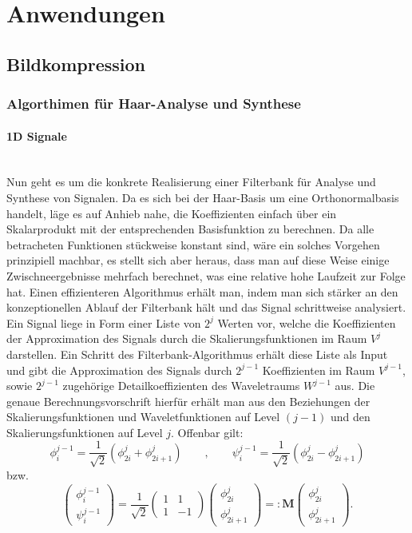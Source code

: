 \section{Anwendungen}
%
\subsection{Bildkompression}
%
\subsubsection{Algorthimen für Haar-Analyse und Synthese}
%
\paragraph{1D Signale}~\\
Nun geht es um die konkrete Realisierung einer Filterbank für Analyse und Synthese von Signalen. Da es sich bei der Haar-Basis um eine Orthonormalbasis handelt, läge es auf Anhieb nahe, die Koeffizienten einfach über ein Skalarprodukt mit der entsprechenden Basisfunktion zu berechnen. Da alle betracheten Funktionen stückweise konstant sind, wäre ein solches Vorgehen prinzipiell machbar, es stellt sich aber heraus, dass man auf diese Weise einige Zwischneergebnisse mehrfach berechnet, was eine relative hohe Laufzeit zur Folge hat. Einen effizienteren Algorithmus erhält man, indem man sich stärker an den konzeptionellen Ablauf der Filterbank hält und das Signal schrittweise analysiert.
%
Ein Signal liege in Form einer Liste von $2^j$ Werten vor, welche die Koeffizienten der Approximation des Signals durch die Skalierungsfunktionen im Raum $V^j$ darstellen. Ein Schritt des Filterbank-Algorithmus erhält diese Liste als Input und gibt die Approximation des Signals durch $2^{j-1}$ Koeffizienten im Raum $V^{j-1}$, sowie $2^{j-1}$ zugehörige Detailkoeffizienten des Waveletraums $W^{j-1}$ aus. Die genaue Berechnungsvorschrift hierfür erhält man aus den Beziehungen der Skalierungsfunktionen und Waveletfunktionen auf Level $(j-1)$ und den Skalierungsfunktionen auf Level $j$. Offenbar gilt:
%
\[
\phi_{i}^{j-1} = \frac{1}{\sqrt{2}}( \phi_{2i}^{j} + \phi_{2i+1}^{j} )
\qquad , \qquad
\psi_{i}^{j-1} = \frac{1}{\sqrt{2}}( \phi_{2i}^{j} - \phi_{2i+1}^{j} )
\]
bzw.
\[
\begin{pmatrix}
\phi_{i}^{j-1} \\
\psi_{i}^{j-1}
\end{pmatrix}
=
\frac{1}{\sqrt{2}}
\begin{pmatrix}
1 & 1 \\
1 & -1
\end{pmatrix}
\begin{pmatrix}
\phi_{2i}^{j} \\
\phi_{2i+1}^{j}
\end{pmatrix}
=:
\mathbf{M}
\begin{pmatrix}
\phi_{2i}^{j} \\
\phi_{2i+1}^{j}
\end{pmatrix}
.
\]
